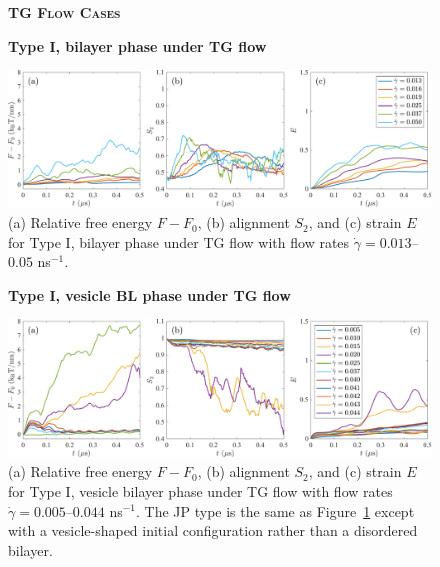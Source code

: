 \begin{figure}[h!]
\begin{center}
\textbf{\textsc{TG Flow Cases}}\par\medskip
\textbf{Type I, bilayer phase under TG flow}\par\medskip
\includegraphics[width=\textwidth]{FigureS5.pdf}
\end{center}
\caption{(a) Relative free energy $F - F_0$, (b) alignment $S_2$, and
  (c) strain $E$ for Type I, bilayer phase under TG flow with flow 
  rates $\dot\gamma=0.013$--$0.05$ ns$^{-1}$.
}
\label{fig:ultgraw}
\end{figure}


\begin{figure}[h!]
\begin{center}
\textbf{Type I, vesicle BL phase under TG flow}\par\medskip
\includegraphics[width=\textwidth]{FigureS6.pdf}
\end{center}
\caption{(a) Relative free energy $F - F_0$, (b) alignment $S_2$, and
  (c) strain $E$ for Type I, vesicle bilayer phase under TG flow with
  flow rates $\dot\gamma=0.005$--$0.044$ ns$^{-1}$. The JP type is the
  same as Figure~\ref{fig:ultgraw} except with a vesicle-shaped initial
  configuration rather than a disordered bilayer.
}
\label{fig:vetgraw}
\end{figure}




